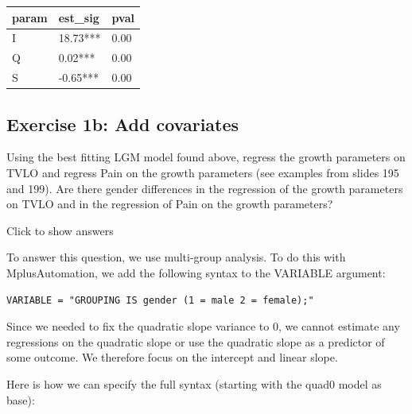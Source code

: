 \documentclass[
]{book}
\begin{document}
\begin{tabular}[t]{l|l|l}
\hline
param & est\_sig & pval\\
\hline
I & 18.73*** & 0.00\\
\hline
Q & 0.02*** & 0.00\\
\hline
S & -0.65*** & 0.00\\
\hline
\end{tabular}

\hypertarget{exercise-1b-add-covariates}{%
\subsection{Exercise 1b: Add covariates}\label{exercise-1b-add-covariates}}

Using the best fitting LGM model found above, regress the growth parameters on TVLO and regress Pain on the growth parameters (see examples from slides 195 and 199).
Are there gender differences in the regression of the
growth parameters on TVLO and in the regression of Pain on the growth parameters?

Click to show answers

To answer this question, we use multi-group analysis.
To do this with MplusAutomation, we add the
following syntax to the VARIABLE argument:

\texttt{VARIABLE\ =\ "GROUPING\ IS\ gender\ (1\ =\ male\ 2\ =\ female);"}

Since we needed to fix the quadratic slope variance to 0, we cannot estimate any
regressions on the quadratic slope or use the quadratic slope as a predictor of some
outcome. We therefore focus on the intercept and linear slope.

Here is how we can specify the full syntax (starting with the quad0 model as base):
\end{document}
